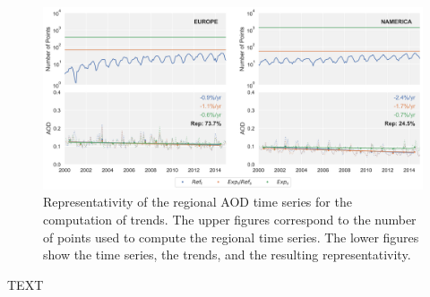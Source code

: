 \documentclass[journal abbreviation, manuscript]{copernicus}
\begin{document}



\begin{figure}[t]
 \includegraphics[width=16cm]{../scripts/figs/representativity.png}
 \caption{Representativity of the regional AOD time series for the computation of trends. The upper figures correspond to the number of points used to compute the regional time series. The lower figures show the time series, the trends, and the resulting representativity.}
 \label{fig:representativity}
\end{figure}

\appendixfigures  %

\appendixtables   %







\begin{acknowledgements}
 TEXT
\end{acknowledgements}
\end{document}
